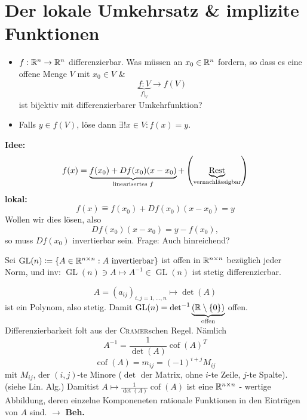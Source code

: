 \section{Der lokale Umkehrsatz \& implizite Funktionen}
\begin{itemize}
	\item $ f : \mathbb{R} ^n \to \mathbb{R} ^n $ differenzierbar.
		Was müssen an $ x_0 \in \mathbb{R} ^n $ fordern, so dass es eine offene Menge $ V $ mit $ x_0 \in V $ \&
		\[
			\underbrace{f : V}_{f|_V} \to f(V)
		\]
		ist bijektiv mit differenzierbarer Umkehrfunktion?
\end{itemize}
\begin{itemize}
	\item Falls $ y \in f(V) $, löse dann $ \exists ! x \in V : f(x) = y $.
\end{itemize}
\textbf{Idee:}
\[
	f(x) = \underbrace{f(x_0) + Df(x_0) (x - x_0)}_{\text{linearisertes $ f $} } + \left( \underbrace{\text{Rest} }_{\text{vernachlässigbar} } \right) 
\]
\textbf{lokal:}
\[
	f(x) \hat{=} f(x_0) + Df(x_0) (x - x_0) = y
\]
Wollen wir dies lösen, also
\[
	Df(x_0) (x - x_0) = y - f(x_0),
\]
so muss $ Df(x_0) $ invertierbar sein.
Frage: Auch hinreichend?

\begin{lemma}
	Sei $ \operatorname{GL}(n) \coloneqq \left\{ A \in \mathbb{R} ^{n \times n} : A \text{ invertierbar}  \right\}  $ ist offen in $ \mathbb{R} ^{n \times n}  $ bezüglich jeder Norm, und inv: $ \operatorname{GL}(n) \ni A \mapsto A^{-1} \in \operatorname{GL}(n) $ ist stetig differenzierbar.
\end{lemma}
\begin{proof*}
	\[
		A = \left( a_{ij}  \right) _{i, j = 1, \dotsc, n} \mapsto \det (A)
	\]
	ist ein Polynom, also stetig.
	Damit $ \operatorname{GL}(n) = \det ^{-1} \underbrace{\left( \mathbb{R} \setminus \left\{ 0 \right\}  \right) }_{\text{offen} } $ offen.
	Differenzierbarkeit folt aus der \textsc{Cramer}schen Regel.
	Nämlich
	\[
		A^{-1} = \frac{ 1 }{ \det(A) } \operatorname{cof}(A)^{T} 
	\]
	\[
		\operatorname{cof}(A) = m_{ij} = (-1)^{i + j} M_{ij} 
	\]
	mit $ M_{ij}  $, der $ (i, j) $-te Minore ($ \det $ der Matrix, ohne $ i $-te Zeile, $ j $-te Spalte).
	(siehe Lin. Alg.)
	Damitist $ A \mapsto \frac{ 1 }{ \det (A) } \operatorname{cof}(A) $ ist eine $ \mathbb{R} ^{n \times n}  $ - wertige Abbildung, deren einzelne Komponeneten rationale Funktionen in den Einträgen von $ A $ sind. $ \to  $ \textbf{Beh.}
\end{proof*}

